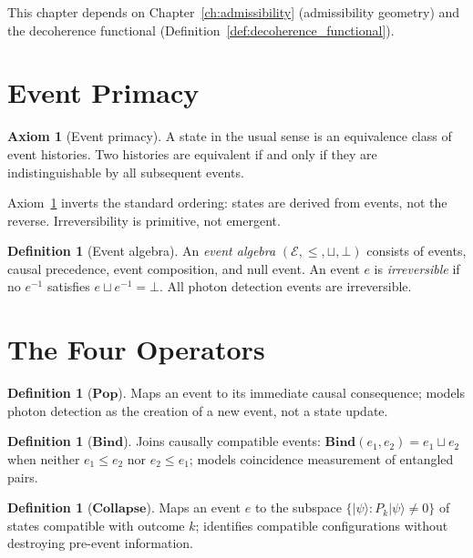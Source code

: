 \documentclass[11pt, openright, twoside]{book}
\theoremstyle{plain}
\theoremstyle{definition}
\newtheorem{definition}[theorem]{Definition}
\newtheorem{axiom}[theorem]{Axiom}
\theoremstyle{remark}
\newcommand{\Pop}{\mathbf{Pop}}
\newcommand{\Bind}{\mathbf{Bind}}
\newcommand{\Collapse}{\mathbf{Collapse}}
\begin{document}
\begin{depbox}
This chapter depends on Chapter~\ref{ch:admissibility} (admissibility geometry) and
the decoherence functional (Definition~\ref{def:decoherence_functional}).
\end{depbox}

\section{Event Primacy}

\begin{axiom}[Event primacy]
\label{axiom:event_primacy}
A state in the usual sense is an equivalence class of event histories. Two histories are
equivalent if and only if they are indistinguishable by all subsequent events.
\end{axiom}

Axiom~\ref{axiom:event_primacy} inverts the standard ordering: states are derived from
events, not the reverse. Irreversibility is primitive, not emergent.

\begin{definition}[Event algebra]
An \emph{event algebra} $(\mathcal{E},\leq,\sqcup,\bot)$ consists of events, causal
precedence, event composition, and null event. An event $e$ is \emph{irreversible} if no
$e^{-1}$ satisfies $e\sqcup e^{-1}=\bot$. All photon detection events are irreversible.
\end{definition}

\section{The Four Operators}

\begin{definition}[$\Pop$] Maps an event to its immediate causal consequence; models photon
detection as the creation of a new event, not a state update.\end{definition}

\begin{definition}[$\Bind$] Joins causally compatible events: $\Bind(e_1,e_2)=e_1\sqcup e_2$
when neither $e_1\leq e_2$ nor $e_2\leq e_1$; models coincidence measurement of entangled pairs.\end{definition}

\begin{definition}[$\Collapse$] Maps an event $e$ to the subspace
$\{|\psi\rangle:P_k|\psi\rangle\neq 0\}$ of states compatible with outcome $k$; identifies
compatible configurations without destroying pre-event information.\end{definition}
\end{document}
